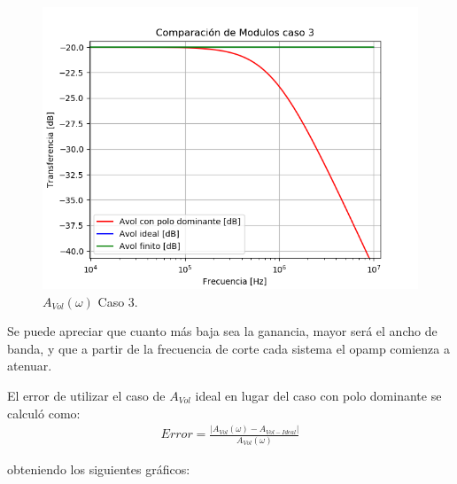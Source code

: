 \begin{figure}[H]	
	\centering
	\includegraphics[width=\textwidth]{Ejercicio1/Imagenes/HCompC3.png}
	\caption{$A_{Vol}(\omega)$ Caso 3.}
	\label{fig:AvolC3}
\end{figure}

Se puede apreciar que cuanto más baja sea la ganancia, mayor será el ancho de banda, y que a partir de la frecuencia de corte cada sistema el opamp comienza a atenuar.

El error de utilizar el caso de $A_{Vol}$ ideal en lugar del caso con polo dominante se calculó como:
\begin{align}
	Error = \frac{|A_{Vol}(\omega)-A_{Vol-Ideal}|}{A_{Vol}(\omega)}
\end{align}

obteniendo los siguientes gráficos:

